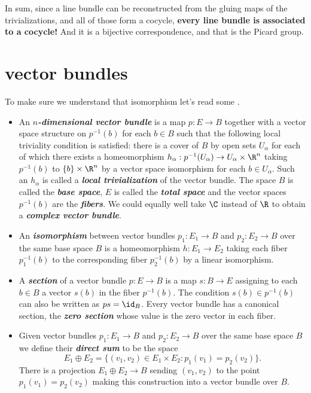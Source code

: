 {\color{cyan} In sum, since a line bundle can be reconstructed from the gluing maps of the trivializations, and all of those form a cocycle, \textbf{every line bundle is associated to a cocycle!} And it is a bijective correspondence, and that is the Picard group.}

\section{vector bundles}
To make sure we understand that isomorphism let's read some \cite{hatcher-vb}.

\begin{defn}\leavevmode
	\begin{itemize}
		\item An \textbf{\textit{$n$-dimensional vector bundle}} is a map $p:E\to B$ together with a vector space structure on $p^{-1}(b)$ for each $b\in B$ such that the following local triviality condition is satisfied: there is a cover of $B$ by open sets $U_\alpha$ for each of which there exists a homeomorphism $h_\alpha:p^{-1}(U_\alpha)\to U_\alpha\times\R^n$ taking $p^{-1}(b)$ to $\{b\}\times\R^n$ by a vector space isomorphism for each $b\in U_\alpha$. Such an $h_\alpha$ is called a \textbf{\textit{local trivialization}} of the vector bundle. The space $B$ is called the \textbf{\textit{base space}}, $E$ is called the \textbf{\textit{total space}} and the vector spaces $p^{-1}(b)$ are the \textbf{\textit{fibers}}. We could equally well take $\C$ instead of $\R$ to obtain a \textbf{\textit{complex vector bundle}}.
		
		\item An \textbf{\textit{isomorphism}} between vector bundles $p_1:E_1\to B$ and $p_2:E_2\to B$ over the same base space $B$ is a homeomorphism $h:E_1\to E_2$ taking each fiber $p_1^{-1}(b)$ to the corresponding fiber $p_2^{-1}(b)$ by a linear isomorphism.
		
		\item A \textbf{\textit{section}} of a vector bundle $p:E\to B$ is a map $s:B\to E$ assigning to each $b\in B$ a vector $s(b)$ in the fiber $p^{-1}(b)$. The condition $s(b)\in p^{-1}(b)$ can also be written as $ps=\id_B$. Every vector bundle has a canonical section, the \textbf{\textit{zero section}} whose value is the zero vector in each fiber.
		
		\item Given vector bundles $p_1:E_1\to B$ and $p_2:E_2\to B$ over the same base space $B$ we define their \textbf{\textit{direct sum}} to be the space
		\[E_1\oplus E_2=\{(v_1,v_2)\in E_1\times E_2:p_1(v_1)=p_2(v_2)\}.\]
		There is a projection $E_1\oplus E_2\to B$ sending $(v_1,v_2)$ to the point $p_1(v_1)=p_2(v_2)$ making this construction into a vector bundle over $B$.
		

\end{itemize}
\end{defn}
